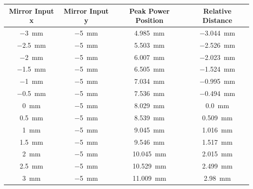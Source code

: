 \begin{table}[ht]
    \centering
    \begin{tabular}{| c | c | c | c |} %
        \hline Mirror Input x & Mirror Input y & Peak Power Position & Relative Distance \\ \hline %
        \SI{-3}{mm}           & \SI{-5}{mm}    & \SI{4.985}{mm}      & \SI{-3.044}{mm}   \\
        \SI{-2.5}{mm}         & \SI{-5}{mm}    & \SI{5.503}{mm}      & \SI{-2.526}{mm}   \\
        \SI{-2}{mm}           & \SI{-5}{mm}    & \SI{6.007}{mm}      & \SI{-2.023}{mm}   \\
        \SI{-1.5}{mm}         & \SI{-5}{mm}    & \SI{6.505}{mm}      & \SI{-1.524}{mm}   \\
        \SI{-1}{mm}           & \SI{-5}{mm}    & \SI{7.034}{mm}      & \SI{-0.995}{mm}   \\
        \SI{-0.5}{mm}         & \SI{-5}{mm}    & \SI{7.536}{mm}      & \SI{-0.494}{mm}   \\
        \SI{0}{mm}            & \SI{-5}{mm}    & \SI{8.029}{mm}      & \SI{0.0}{mm}      \\
        \SI{0.5}{mm}          & \SI{-5}{mm}    & \SI{8.539}{mm}      & \SI{0.509}{mm}    \\
        \SI{1}{mm}            & \SI{-5}{mm}    & \SI{9.045}{mm}      & \SI{1.016}{mm}    \\
        \SI{1.5}{mm}          & \SI{-5}{mm}    & \SI{9.546}{mm}      & \SI{1.517}{mm}    \\
        \SI{2}{mm}            & \SI{-5}{mm}    & \SI{10.045}{mm}     & \SI{2.015}{mm}    \\
        \SI{2.5}{mm}          & \SI{-5}{mm}    & \SI{10.529}{mm}     & \SI{2.499}{mm}    \\
        \SI{3}{mm}            & \SI{-5}{mm}    & \SI{11.009}{mm}     & \SI{2.98}{mm}     \\

        \hline



\end{tabular}
\end{table}
